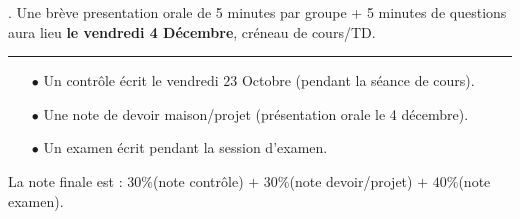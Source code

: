 \documentclass[12pt,a4paper]{article}
\begin{document}
. Une brève presentation orale de 5 minutes par groupe + 5 minutes de questions aura lieu {\bf le vendredi 4 Décembre}, créneau de cours/TD. 

 \bigskip 
\bigskip
\hrule
\bigskip
{}
\begin{itemize}
\item[$\bullet$] Un contr\^ole \'ecrit le vendredi $23$ Octobre (pendant la s\'eance de cours). 
\item[$\bullet$] Une note de devoir maison/projet (présentation orale le 4 décembre).
\item[$\bullet$] Un examen \'ecrit pendant la session d'examen. 
\end{itemize}
La note finale est : $30\%$(note contr\^ole) $+$
$30\%$(note devoir/projet) $+$
$40\%$(note examen).
\end{document}

